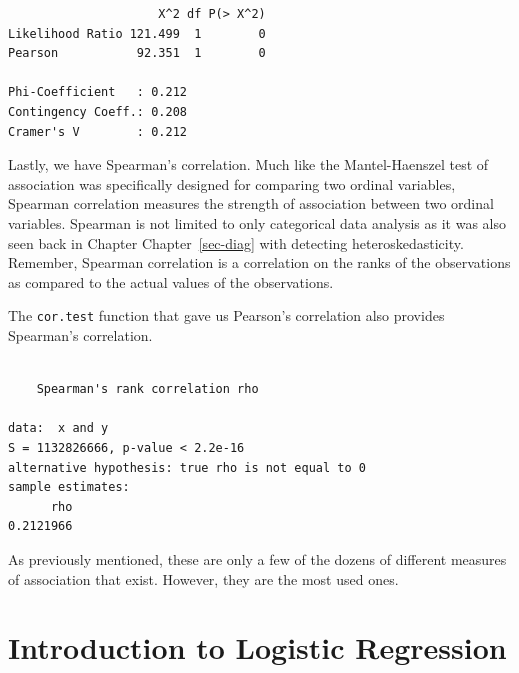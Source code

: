 \documentclass[
  letterpaper,
  DIV=11,
  numbers=noendperiod]{scrreprt}
\newenvironment{Shaded}{\begin{snugshade}}{\end{snugshade}}
\newcommand{\AttributeTok}[1]{\textcolor[rgb]{0.40,0.45,0.13}{#1}}
\newcommand{\FunctionTok}[1]{\textcolor[rgb]{0.28,0.35,0.67}{#1}}
\newcommand{\NormalTok}[1]{\textcolor[rgb]{0.00,0.23,0.31}{#1}}
\newcommand{\SpecialCharTok}[1]{\textcolor[rgb]{0.37,0.37,0.37}{#1}}
\newcommand{\StringTok}[1]{\textcolor[rgb]{0.13,0.47,0.30}{#1}}
\begin{document}
\begin{verbatim}
                     X^2 df P(> X^2)
Likelihood Ratio 121.499  1        0
Pearson           92.351  1        0

Phi-Coefficient   : 0.212 
Contingency Coeff.: 0.208 
Cramer's V        : 0.212 
\end{verbatim}

Lastly, we have Spearman's correlation. Much like the Mantel-Haenszel
test of association was specifically designed for comparing two ordinal
variables, Spearman correlation measures the strength of association
between two ordinal variables. Spearman is not limited to only
categorical data analysis as it was also seen back in Chapter
Chapter~\ref{sec-diag} with detecting heteroskedasticity. Remember,
Spearman correlation is a correlation on the ranks of the observations
as compared to the actual values of the observations.

The \texttt{cor.test} function that gave us Pearson's correlation also
provides Spearman's correlation.

\begin{Shaded}
\end{Shaded}

\begin{verbatim}

    Spearman's rank correlation rho

data:  x and y
S = 1132826666, p-value < 2.2e-16
alternative hypothesis: true rho is not equal to 0
sample estimates:
      rho 
0.2121966 
\end{verbatim}

As previously mentioned, these are only a few of the dozens of different
measures of association that exist. However, they are the most used
ones.

\hypertarget{introduction-to-logistic-regression}{%
\section{Introduction to Logistic
Regression}\label{introduction-to-logistic-regression}}
\end{document}
